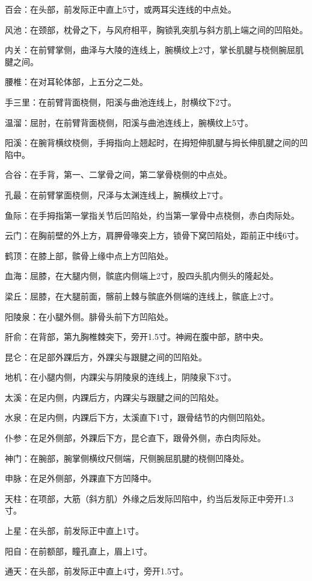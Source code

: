 \documentclass[12pt,UTF8,openany]{ctexbook}
\begin{document}
百会：在头部，前发际正中直上5寸，或两耳尖连线的中点处。

风池：在颈部，枕骨之下，与风府相平，胸锁乳突肌与斜方肌上端之间的凹陷处。

内关：在前臂掌侧，曲泽与大陵的连线上，腕横纹上2寸，掌长肌腱与桡侧腕屈肌腱之间。

腰椎：在对耳轮体部，上五分之二处。

手三里：在前臂背面桡侧，阳溪与曲池连线上，肘横纹下2寸。

温溜：屈肘，在前臂背面桡侧，阳溪与曲池连线上，腕横纹上5寸。

阳溪：在腕背横纹桡侧，手拇指向上翘起时，在拇短伸肌腱与拇长伸肌腱之间的凹陷中。

合谷：在手背，第一、二掌骨之间，第二掌骨桡侧的中点处。

孔最：在前臂掌面桡侧，尺泽与太渊连线上，腕横纹上7寸。

鱼际：在手拇指第一掌指关节后凹陷处，约当第一掌骨中点桡侧，赤白肉际处。

云门：在胸前壁的外上方，肩胛骨喙突上方，锁骨下窝凹陷处，距前正中线6寸。

鹤顶：在膝上部，髌骨上缘中点上方凹陷处。

血海：屈膝，在大腿内侧，髌底内侧端上2寸，股四头肌内侧头的隆起处。

梁丘：屈膝，在大腿前面，髂前上棘与髌底外侧端的连线上，髌底上2寸。

阳陵泉：在小腿外侧。腓骨头前下方凹陷处。

肝俞：在背部，第九胸椎棘突下，旁开1.5寸。神阙在腹中部，脐中央。

昆仑：在足部外踝后方，外踝尖与跟腱之间的凹陷处。

地机：在小腿内侧，内踝尖与阴陵泉的连线上，阴陵泉下3寸。

太溪：在足内侧，内踝后方，内踝尖与跟腱之间的凹陷处。

水泉：在足内侧，内踝后下方，太溪直下1寸，跟骨结节的内侧凹陷处。

仆参：在足外侧部，外踝后下方，昆仑直下，跟骨外侧，赤白肉际处。

神门：在腕部，腕掌侧横纹尺侧端，尺侧腕屈肌腱的桡侧凹降处。

申脉：在足外侧部，外踝直下方凹降中。

天柱：在项部，大筋（斜方肌）外缘之后发际凹陷中，约当后发际正中旁开1.3寸。

上星：在头部，前发际正中直上1寸。

阳自：在前额部，瞳孔直上，眉上1寸。

通天：在头部，前发际正中直上4寸，旁开1.5寸。
\end{document}
